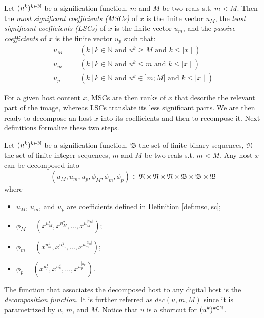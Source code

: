 \documentclass{comjnl}
\begin{document}
\begin{definition}\label{def:msc,lsc}
Let $(u^k)^{k \in \mathbb{N}}$ be a signification function, 
$m$ and $M$ be two reals s.t. $m < M$. Then 
the \emph{most significant coefficients (MSCs)} of $x$ is the finite 
  vector $u_M$, 
the \emph{least significant coefficients (LSCs)} of $x$ is the 
finite vector $u_m$, and 
the \emph{passive coefficients} of $x$ is the finite vector $u_p$ such that:
\begin{eqnarray*}
  u_M &=& \left( k ~ \big|~ k \in \mathds{N} \textrm{ and } u^k 
    \geqslant M \textrm{ and }  k \le \mid x \mid \right) \\
  u_m &=& \left( k ~ \big|~ k \in \mathds{N} \textrm{ and } u^k 
  \le m \textrm{ and }  k \le \mid x \mid \right) \\
   u_p &=& \left( k ~ \big|~ k \in \mathds{N} \textrm{ and } 
u^k \in ]m;M[ \textrm{ and }  k \le \mid x \mid \right)
\end{eqnarray*}
 \end{definition}

For a given host content $x$,
MSCs are then ranks of $x$  that describe the relevant part
of the image, whereas LSCs translate its less significant parts.
We are then ready to decompose an host $x$ into its coefficients and 
then to recompose it. Next definitions formalize these two steps. 

\begin{definition}
Let $(u^k)^{k \in \mathbb{N}}$ be a signification function, 
$\mathfrak{B}$ the set of finite binary sequences,
$\mathfrak{N}$ the set of finite integer sequences, 
$m$ and $M$ be two reals s.t. $m < M$.  
Any host $x$ can be decomposed into 
\[
(u_M,u_m,u_p,\phi_{M},\phi_{m},\phi_{p})
\in
\mathfrak{N} \times 
\mathfrak{N} \times 
\mathfrak{N} \times 
\mathfrak{B} \times 
\mathfrak{B} \times 
\mathfrak{B} 
\]
where
\begin{itemize}
\item $u_M$, $u_m$, and $u_p$ are coefficients defined in Definition  
\ref{def:msc,lsc};
\item $\phi_{M} = \left( x^{u^1_M}, x^{u^2_M}, \ldots,x^{u^{|u_M|}_M}\right)$;
 \item $\phi_{m} = \left( x^{u^1_m}, x^{u^2_m}, \ldots,x^{u^{|u_m|}_m} \right)$;
 \item $\phi_{p} =\left( x^{u^1_p}, x^{u^2_p}, \ldots,x^{u^{|u_p|}_p}\right) $.
 \end{itemize}
The function that associates the decomposed host to any digital host is 
the \emph{decomposition function}. It is 
further referred as $\textit{dec}(u,m,M)$ since it is parametrized by 
$u$, $m$, and $M$. Notice that $u$ is a shortcut for $(u^k)^{k \in \mathbb{N}}$.
\end{definition} 
\end{document}
